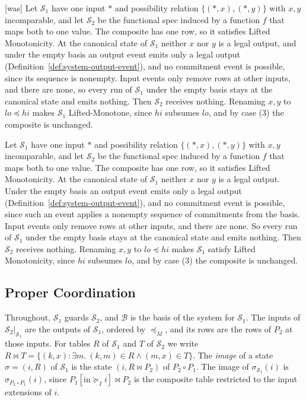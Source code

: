 \documentclass[sigconf]{cidr-2027}
\theoremstyle{remark}
\newcommand{\InputGe}{\succeq_I}
\newcommand{\commitment}{commitment\xspace}
\newcommand{\commitments}{commitments\xspace}
\newcommand{\indescs}{input extensions\xspace}
\newcommand{\Spec}{\mathcal{S}}
\begin{document}
{\footnotesize\color{black!50}\noindent\textsf{[was]} Let $\mathcal S_1$ have one input $*$ and possibility relation
$\{(*,x),(*,y)\}$ with $x,y$ incomparable, and let $\mathcal S_2$ be the
functional spec induced by a function $f$ that maps
both to one value.  The composite has one row, so it satisfies Lifted
Monotonicity.  At the canonical state of $\mathcal S_1$ neither $x$ nor $y$ is
a legal output, and under the empty basis an output event emits only a legal
output (Definition~\ref{def:system-output-event}), and no \commitment event is
possible, since its sequence is nonempty.  Input
events only remove rows at other inputs, and there are none, so every run of
$\mathcal S_1$ under the empty basis stays at the canonical state and emits
nothing.  Then $\mathcal S_2$ receives nothing.  Renaming $x,y$ to
$\mathit{lo}\preceq\mathit{hi}$ makes $\mathcal S_1$ Lifted-Monotone, since
$\mathit{hi}$ subsumes $\mathit{lo}$, and by case (3) the composite is
unchanged.\par}

\color{blue!70!black}Let $\mathcal S_1$ have one input $*$ and possibility relation
$\{(*,x),(*,y)\}$ with $x,y$ incomparable, and let $\mathcal S_2$ be the
functional spec induced by a function $f$ that maps
both to one value.  The composite has one row, so it satisfies Lifted
Monotonicity.  At the canonical state of $\mathcal S_1$ neither $x$ nor $y$ is
a legal output.  Under the empty basis an output event emits only a legal
output (Definition~\ref{def:system-output-event}), and no \commitment event is
possible, since such an event applies a nonempty sequence of \commitments from
the basis.  Input events only remove rows at other inputs, and there are none.
So every run of $\mathcal S_1$ under the empty basis stays at the canonical
state and emits nothing.  Then $\mathcal S_2$ receives nothing.  Renaming $x,y$ to
$\mathit{lo}\preceq\mathit{hi}$ makes $\mathcal S_1$ satisfy Lifted Monotonicity, since
$\mathit{hi}$ subsumes $\mathit{lo}$, and by case (3) the composite is
unchanged.\color{black}

\subsection{Proper Coordination}

Throughout, $\Spec_1$ guards $\Spec_2$, and $\mathcal B$ is the basis of the
system for $\Spec_1$.  The inputs of $\Spec_2|_{\Spec_1}$ are the outputs of
$\Spec_1$, ordered by $\preceq_M$, and its rows are the rows of $P_2$ at those
inputs.  For tables $R$ of $\Spec_1$ and $T$ of $\Spec_2$ we write $R\Join
T=\{(k,x):\exists m.\ (k,m)\in R\land(m,x)\in T\}$.  The \emph{image} of a
state $\sigma=(i,R)$ of $\Spec_1$ is the state $(i,R\Join P_2)$ of
$P_2\circ P_1$.  The image of $\sigma_{\Spec_1}(i)$ is
$\sigma_{P_2\circ P_1}(i)$, since $P_1[\mathrm{in}\InputGe i]\Join P_2$ is the
composite table restricted to the \indescs of $i$.
\end{document}
